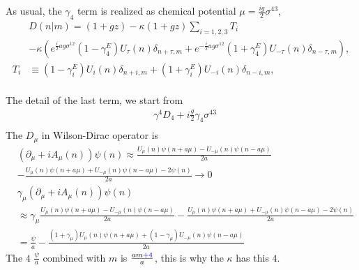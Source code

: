As usual, the $\gamma _4$ term is realized as chemical potential $\mu = \frac{ig}{2}\sigma ^{43}$,
\begin{equation}
\begin{split}
&D(n|m)=(1+gz)-\kappa (1+gz)\sum _{i = 1,2,3} T_i \\
&-\kappa \left(e^{\frac{i}{2}ag \sigma ^{12} } (1-\gamma^E _4) U_{\tau}(n)\delta _{n+\tau, m} + e^{-\frac{i}{2}ag \sigma ^{12} } (1+\gamma^E _4) U_{-\tau}(n)\delta _{n-\tau, m}\right),\\
T_{i}&\equiv (1-\gamma _i^E)U_{i}(n)\delta _{n+i,m}+(1+\gamma _i^E)U_{-i}(n)\delta _{n-i,m},\\
\end{split}
\end{equation}

The detail of the last term, we start from
\begin{equation}
\begin{split}
&\gamma ^4D_4+i\frac{g}{2}\gamma _4 \sigma ^{43}\\
\end{split}
\end{equation}
The $D_{\mu}$ in Wilson-Dirac operator is
\begin{equation}
\begin{split}
&\left(\partial _{\mu} + iA_{\mu}(n)\right)\psi(n)\approx  \frac{U_{\mu}(n)\psi(n+a\mu)-U_{-\mu}(n)\psi(n-a\mu)}{2a}\\
& -\frac{U_{\mu}(n)\psi(n+a\mu)+U_{-\mu}(n)\psi(n-a\mu)-2\psi (n)}{2a} \to 0 \\
& \gamma _{\mu}  \left(\partial _{\mu} + iA_{\mu}(n)\right)\psi(n) \\
&\approx \gamma _{\mu}  \frac{U_{\mu}(n)\psi(n+a\mu)-U_{-\mu}(n)\psi(n-a\mu)}{2a} -\frac{U_{\mu}(n)\psi(n+a\mu)+U_{-\mu}(n)\psi(n-a\mu)-2\psi (n)}{2a}\\
&=\frac{\psi}{a} -   \frac{(1+\gamma _{\mu})U_{\mu}(n)\psi(n+a\mu)+(1-\gamma _{\mu})U_{-\mu}(n)\psi(n-a\mu)}{2a}
\end{split}
\end{equation}
The $4$ $\frac{\psi}{a}$ combined with $m$ is $\frac{am\textcolor[rgb]{0,0,1}{+4}}{a}$, this is why the $\kappa$ has this $4$.

